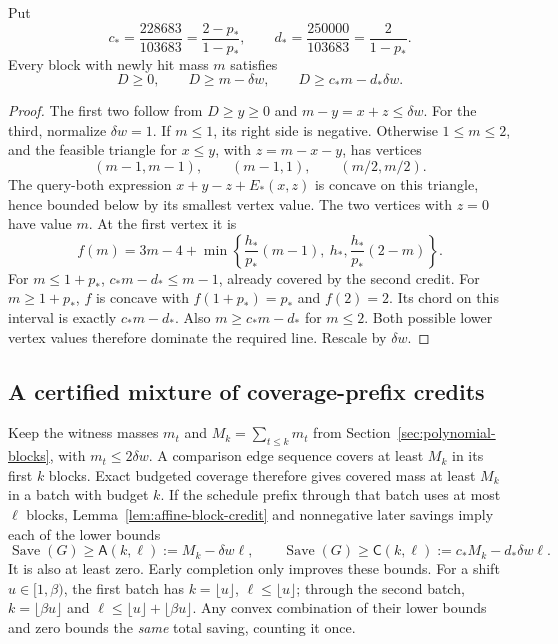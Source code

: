 

\begin{lemma}\label{lem:affine-block-credit}
Put
\[
 c_* =\frac{228683}{103683}=\frac{2-p_*}{1-p_*},\qquad
 d_* =\frac{250000}{103683}=\frac2{1-p_*}.
\]
Every block with newly hit mass $m$ satisfies
\[
 D\ge0,\qquad D\ge m-\delta w,\qquad
 D\ge c_*m-d_*\delta w.
\]
\end{lemma}
\begin{proof}
The first two follow from $D\ge y\ge0$ and
$m-y=x+z\le\delta w$. For the third, normalize $\delta w=1$.
If $m\le1$, its right side is negative. Otherwise $1\le m\le2$,
and the feasible triangle for $x\le y$, with $z=m-x-y$, has vertices
\[
 (m-1,m-1),\qquad(m-1,1),\qquad(m/2,m/2).
\]
The query-both expression $x+y-z+E_*(x,z)$ is concave on this
triangle, hence bounded below by its smallest vertex value. The
two vertices with $z=0$ have value $m$. At the first vertex it is
\[
 f(m)=3m-4+
       \min\left\{\frac{h_*}{p_*}(m-1),\ h_*,
                            \frac{h_*}{p_*}(2-m)\right\}.
\]
For $m\le1+p_*$, $c_*m-d_*\le m-1$, already covered by the
second credit. For $m\ge1+p_*$, $f$ is concave with
$f(1+p_*)=p_*$ and $f(2)=2$. Its chord on this interval is
exactly $c_*m-d_*$. Also $m\ge c_*m-d_*$ for $m\le2$.
Both possible lower vertex values therefore dominate the required
line. Rescale by $\delta w$.
\end{proof}

\subsection{A certified mixture of coverage-prefix credits}

Keep the witness masses $m_t$ and $M_k=\sum_{t\le k}m_t$ from
Section~\ref{sec:polynomial-blocks}, with $m_t\le2\delta w$.
A comparison edge sequence covers at least $M_k$ in its first $k$
blocks. Exact budgeted coverage therefore gives covered mass at least
$M_k$ in a batch with budget $k$. If the schedule prefix through
that batch uses at most $\ell$ blocks, Lemma~\ref{lem:affine-block-credit}
and nonnegative later savings imply each of the lower bounds
\[
 \operatorname{Save}(G)\ge
 \mathsf A(k,\ell):=M_k-\delta w\ell,
 \qquad
 \operatorname{Save}(G)\ge
 \mathsf C(k,\ell):=c_*M_k-d_*\delta w\ell.
\]
It is also at least zero. Early completion only improves these bounds.
For a shift $u\in[1,\beta)$, the first batch has
$k=\lfloor u\rfloor$, $\ell\le\lfloor u\rfloor$; through the
second batch, $k=\lfloor\beta u\rfloor$ and
$\ell\le\lfloor u\rfloor+\lfloor\beta u\rfloor$.
Any convex combination of their lower bounds and zero bounds the
\emph{same} total saving, counting it once.

